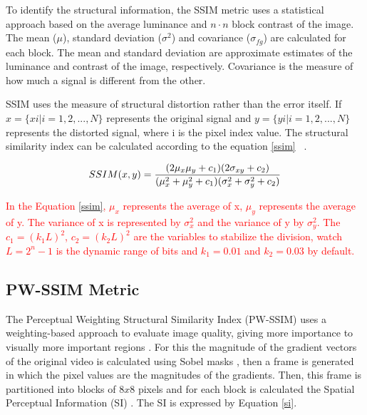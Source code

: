 \documentclass[journal]{IEEEtran}
\begin{document}
To identify the structural information, the SSIM metric uses a statistical approach based on the average luminance and $n \cdot n$ block contrast of the image. The mean ($\mu$), standard deviation ($\sigma^{2}$) and covariance ($\sigma_{fg}$) are calculated for each block. The mean and standard deviation are approximate estimates of the luminance and contrast of the image, respectively. Covariance is the measure of how much a signal is different from the other.

SSIM uses the measure of structural distortion rather than the error itself. If $x = \{x i | i = 1, 2,. . . , N\}$ represents the original signal and $y = \{y i | i = 1, 2,. . . , N\}$ represents the distorted signal, where i is the pixel index value. The structural similarity index can be calculated according to the equation \ref{ssim} ~\cite{oliveira:16}\cite{Wang:02}.

\begin{equation}
\label{ssim}
\centering
SSIM(x, y) = \frac{(2\mu _{x}\mu _{y} + c _{1})(2\sigma _{xy}+c _{2})}{(\mu_{x}^{2}+\mu_{y}^{2}+ c_{1})(\sigma _{x}^{2}+\sigma _{y}^{2}+c _{2})}
\end{equation}


\textcolor{red}{
In the Equation \ref{ssim},  $\mu_{x}$ represents the average of x,  $\mu_{y}$ represents the average of y. The variance of x is represented by $\sigma _{x}^{2}$ and the variance of y by $\sigma _{y}^{2}$. The $c_{1}=(k_{1}L)^{2}$, $c_{2}=(k_{2}L)^{2}$ are the variables to stabilize the division, watch $L = 2^{n} - 1$ is the dynamic range of bits and $k_{1}=0.01$ and $k_{2}=0.03$ by default.
}





\subsection{PW-SSIM Metric}

The Perceptual Weighting Structural Similarity Index (PW-SSIM) uses a weighting-based approach to evaluate image quality, giving more importance to visually more important regions \cite{danilo:15a}. For this the magnitude of the gradient vectors of the original video is calculated using Sobel masks \cite{furnari:15}, then a frame is generated in which the pixel values are the magnitudes of the gradients. Then, this frame is partitioned into blocks of $8 x 8$ pixels and for each block is calculated the Spatial Perceptual Information (SI) \cite{jean:15}. The SI is expressed by Equation \ref{si}.
\end{document}
